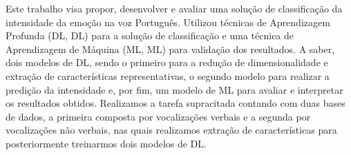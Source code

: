 Este trabalho visa propor, desenvolver e avaliar uma solução de classificação da intensidade da emoção na voz Português. Utilizou técnicas de Aprendizagem Profunda (\acrlong{DL}, \acrshort{DL}) para a solução de classificação e uma técnica de Aprendizagem de Máquina (\acrlong{ML}, \acrshort{ML}) para validação dos resultados. A saber, dois modelos de \acrlong{DL}, sendo o primeiro para a redução de dimensionalidade e extração de características representativas, o segundo modelo para realizar a predição da intensidade e, por fim, um modelo de \acrlong{ML} para avaliar e interpretar os resultados obtidos. Realizamos a tarefa supracitada contando com duas bases de dados, a primeira composta por vocalizações verbais e a segunda por vocalizações não verbais, nas quais realizamos extração de características para posteriormente treinarmos dois modelos de \acrshort{DL}.%




